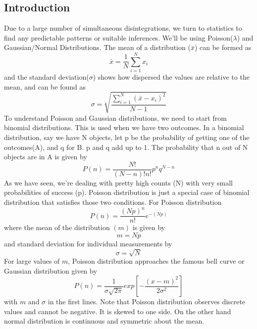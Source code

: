 \documentclass[twocolumn]{article}
\begin{document}
\subsection*{Introduction}
Due to a large number of simultaneous disintegrations, we turn to statistics to find any predictable patterns or suitable inferences. We'll be using Poisson($\lambda$) and Gaussian/Normal Distributions. The mean of a distribution ($\bar{x}$) can be formed as
\begin{equation*}
\bar{x} = \frac{1}{N} \sum_{i=1}^{N} x_i
\end{equation*}
and the standard deviation($\sigma$) shows how dispersed the values are relative to the mean, and can be found as
\begin{equation*}
\sigma = \sqrt{\frac{\sum_{i=1}^{N}(\bar{x}-x_i)^2}{N-1}}
\end{equation*}
To understand Poisson and Gaussian distributions, we need to start from binomial distributions. This is used when we have two outcomes. In a binomial distribution, say we have N objects,  let p be the probability of getting one of the outcomes(A), and q for B. p and q add up to 1. The probability that n out of N objects are in A is given by 
\begin{equation*}
P(n)=\frac{N!}{(N-n)!n!}p^nq^{N-n}
\end{equation*}
As we have seen, we're dealing with pretty high counts (N) with very small probabilities of success (p). Poisson distribution is just a special case of binomial distribution that satisfies those two conditions. For Poisson distribution
\begin{equation*}
P(n)=\frac{(Np)^n}{n!}e^{-(Np)}
\end{equation*}
where the mean of the distribution $(m)$ is given by 
\begin{equation*}
m=Np
\end{equation*}
and standard deviation for individual measurements by 
\begin{equation*}
\sigma=\sqrt{N}
\end{equation*}
For large values of $m$, Poisson distribution approaches the famous bell curve or Gaussian distribution given by 
\begin{equation*}
P(n)=\frac{1}{\sigma \sqrt{2\pi}}exp[-\frac{(x-m)^2}{2\sigma^2}]
\end{equation*}
with $m$ and $\sigma$ in the first lines. Note that Poisson distribution observes discrete values and cannot be negative. It is skewed to one side. On the other hand normal distribution is continuous and symmetric about the mean.
\end{document}
